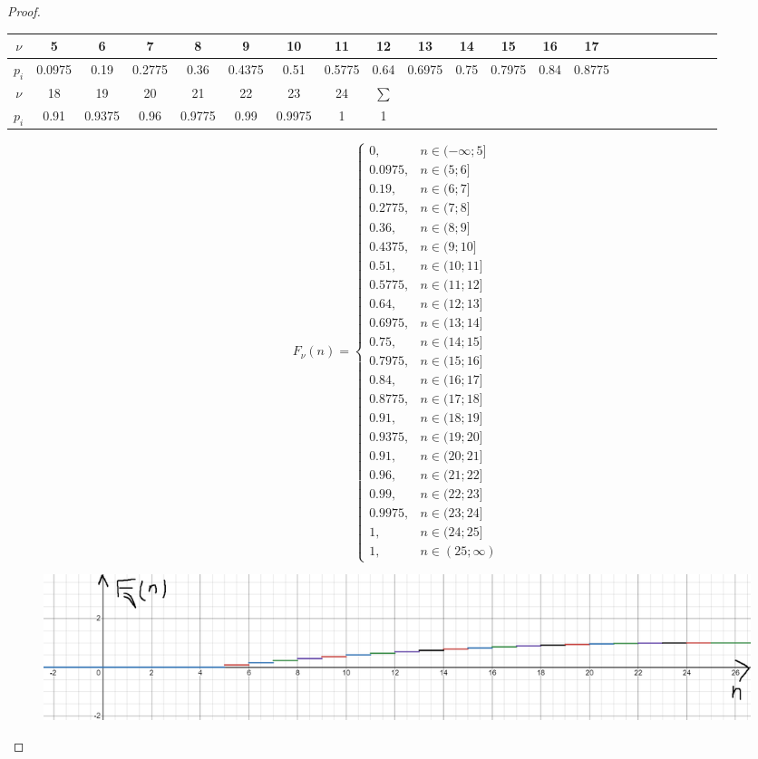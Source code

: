 \begin{proof}
\begin{table}[H]
    \centering
    \begin{tabular}{|c|c|c|c|c|c|c|c|c|c|c|c|c|c|c|c|c|c|c|c|c|c|}
    \hline
        $\nu$ & 5 & 6 & 7 & 8 & 9 & 10 & 11 & 12 & 13 & 14 & 15 & 16 & 17\\
    \hline
        $p_i$& 0.0975 & 0.19 & 0.2775 & 0.36 & 0.4375 & 0.51 & 0.5775 & 0.64 & 0.6975 & 0.75 & 0.7975 & 0.84 & 0.8775\\
    \hline
        $\nu$& 18 & 19 & 20 & 21 & 22 & 23 & 24 & $\sum$\\
    \hline
        $p_i$& 0.91 & 0.9375 & 0.96 & 0.9775 & 0.99 & 0.9975 & 1 & 1\\
    \hline
    \end{tabular}
\end{table}

\[
F_{\nu}(n) = \begin{cases}
    0, & n\in (-\infty;5]\\
    0.0975, & n\in (5;6]\\
    0.19, & n\in (6;7]\\
    0.2775, & n\in (7;8]\\
   0.36, & n\in (8;9]\\
     0.4375, & n\in (9;10]\\
     0.51, & n\in (10;11]\\
    0.5775, & n\in (11;12]\\
    0.64 , & n\in (12;13]\\
    0.6975, & n\in (13;14]\\
    0.75, & n\in (14;15]\\
    0.7975, & n\in (15;16]\\
   0.84, & n\in (16;17]\\
    0.8775, & n\in (17;18]\\
   0.91, & n\in (18;19]\\
    0.9375, & n\in (19;20]\\
    0.91, & n\in (20;21]\\
    0.96, & n\in (21;22]\\
    0.99, & n\in (22;23]\\
     0.9975, & n\in (23;24]\\
    1, & n\in (24;25]\\
    1, & n\in (25;\infty)
\end{cases}
\]

\begin{figure}[H]
    \centering
    \includegraphics[width=0.5\linewidth]{3idz_4png.png}
    \caption{}
    \label{fig:enter-label}
\end{figure}


\end{proof}
